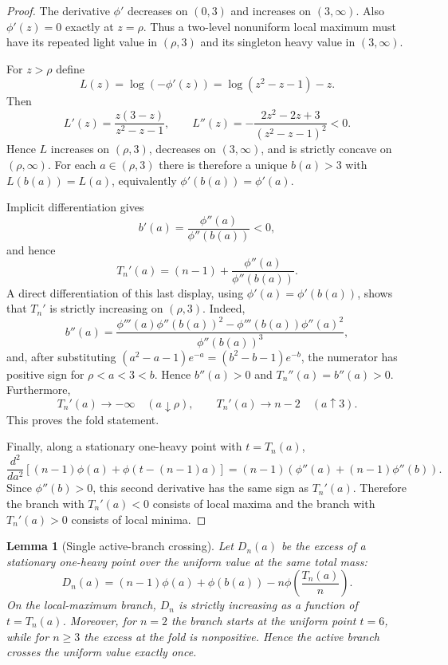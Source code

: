 \documentclass[11pt]{article}
\newtheorem{lemma}[theorem]{Lemma}
\theoremstyle{definition}
\begin{document}
\begin{proof}
The derivative $\phi'$ decreases on $(0,3)$ and increases on $(3,\infty)$.  Also $\phi'(z)=0$ exactly at $z=\rho$.  Thus a two-level nonuniform local maximum must have its repeated light value in $(\rho,3)$ and its singleton heavy value in $(3,\infty)$.

For $z>\rho$ define
\[
  L(z)=\log(-\phi'(z))=\log(z^2-z-1)-z.
\]
Then
\[
  L'(z)=\frac{z(3-z)}{z^2-z-1},
  \qquad
  L''(z)=-\frac{2z^2-2z+3}{(z^2-z-1)^2}<0.
\]
Hence $L$ increases on $(\rho,3)$, decreases on $(3,\infty)$, and is strictly concave on $(\rho,\infty)$.  For each $a\in(\rho,3)$ there is therefore a unique $b(a)>3$ with $L(b(a))=L(a)$, equivalently $\phi'(b(a))=\phi'(a)$.

Implicit differentiation gives
\[
  b'(a)=\frac{\phi''(a)}{\phi''(b(a))}<0,
\]
and hence
\[
  T_n'(a)=(n-1)+\frac{\phi''(a)}{\phi''(b(a))}.
\]
A direct differentiation of this last display, using $\phi'(a)=\phi'(b(a))$, shows that $T_n'$ is strictly increasing on $(\rho,3)$.  Indeed,
\[
  b''(a)=\frac{\phi'''(a)\phi''(b(a))^2-
           \phi'''(b(a))\phi''(a)^2}{\phi''(b(a))^3},
\]
and, after substituting
$(a^2-a-1)e^{-a}=(b^2-b-1)e^{-b}$, the numerator has positive sign for
$\rho<a<3<b$.  Hence $b''(a)>0$ and $T_n''(a)=b''(a)>0$.  Furthermore,
\[
  T_n'(a)\to-\infty \quad(a\downarrow\rho),
  \qquad
  T_n'(a)\to n-2 \quad(a\uparrow3).
\]
This proves the fold statement.

Finally, along a stationary one-heavy point with $t=T_n(a)$,
\[
  \frac{d^2}{da^2}\left[(n-1)\phi(a)+\phi(t-(n-1)a)\right]
  =(n-1)\left(\phi''(a)+(n-1)\phi''(b)\right).
\]
Since $\phi''(b)>0$, this second derivative has the same sign as $T_n'(a)$.  Therefore the branch with $T_n'(a)<0$ consists of local maxima and the branch with $T_n'(a)>0$ consists of local minima.
\end{proof}

\begin{lemma}[Single active-branch crossing]\label{lem:gt-single-crossing}
Let $D_n(a)$ be the excess of a stationary one-heavy point over the uniform value at the same total mass:
\[
  D_n(a)=(n-1)\phi(a)+\phi(b(a))
       -n\phi\left(\frac{T_n(a)}{n}\right).
\]
On the local-maximum branch, $D_n$ is strictly increasing as a function of $t=T_n(a)$.  Moreover, for $n=2$ the branch starts at the uniform point $t=6$, while for $n\ge3$ the excess at the fold is nonpositive.  Hence the active branch crosses the uniform value exactly once.
\end{lemma}
\end{document}
